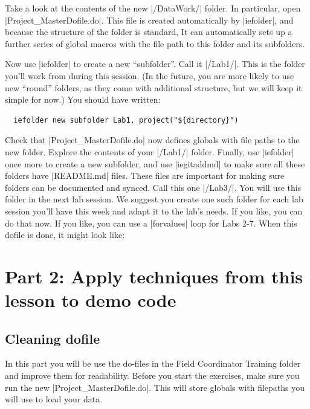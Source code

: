 \documentclass{tufte-handout}
\begin{document}
Take a look at the contents of the new |/DataWork/| folder.
In particular, open |Project_MasterDofile.do|.
This file is created automatically by |iefolder|,
and because the structure of the folder is standard,
It can automatically sets up a further series of global macros
with the file path to this folder and its subfolders.

Now use |iefolder| to create a new ``subfolder''.
Call it |/Lab1/|. This is the folder you’ll work from during this session.
(In the future, you are more likely to use new ``round'' folders,
as they come with additional structure,
but we will keep it simple for now.)
You should have written:
\begin{Verbatim}
  iefolder new subfolder Lab1, project("${directory}")
\end{Verbatim}
Check that |Project_MasterDofile.do| now defines globals
with file paths to the new folder.
Explore the contents of your |/Lab1/| folder.
Finally, use |iefolder| once more to create a new subfolder,
and use |iegitaddmd|
to make sure all these folders have |README.md| files.
These files are important for making sure folders can be documented and synced.
Call this one |/Lab3/|. You will use this folder in the next lab session.
We suggest you create one such folder for each lab session you’ll have this week
and adapt it to the lab’s needs. If you like, you can do that now.
If you like, you can use a |forvalues| loop for Labs 2-7.
When this dofile is done, it might look like:

\begin{figure}
{
}
\end{figure}

\section{Part 2: Apply techniques from this lesson to demo code}

\subsection{Cleaning dofile}

In this part you will be use the do-files in the Field Coordinator Training folder
and improve them for readability.
Before you start the exercises, make sure you run the new |Project_MasterDofile.do|.
This will store globals with filepaths you will use to load your data.
\end{document}
